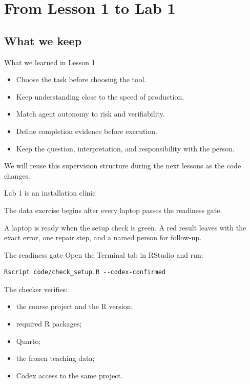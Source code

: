 \section{From Lesson 1 to Lab 1}
\subsection{What we keep}

\begin{frame}{What we learned in Lesson 1}
  \begin{itemize}
    \item Choose the task before choosing the tool.
    \item Keep understanding close to the speed of production.
    \item Match agent autonomy to risk and verifiability.
    \item Define completion evidence before execution.
    \item Keep the question, interpretation, and responsibility with the person.
  \end{itemize}

  \vfill
  We will reuse this supervision structure during the next lessons as the code
  changes.
\end{frame}

\begin{frame}{Lab 1 is an installation clinic}
  \vfill
  \begin{center}
    {\LARGE\color{crimson}The data exercise begins after every laptop passes the readiness gate.}

    \vspace{0.8em}
    A laptop is ready when the setup check is green. A red result leaves with
    the exact error, one repair step, and a named person for follow-up.
  \end{center}
  \vfill
\end{frame}

\begin{frame}[fragile]{The readiness gate}
  Open the Terminal tab in RStudio and run:

\begin{lstlisting}
Rscript code/check_setup.R --codex-confirmed
\end{lstlisting}

  The checker verifies:
  \begin{itemize}
    \item the course project and the R version;
    \item required R packages;
    \item Quarto;
    \item the frozen teaching data;
    \item Codex access to the same project.
  \end{itemize}
\end{frame}

